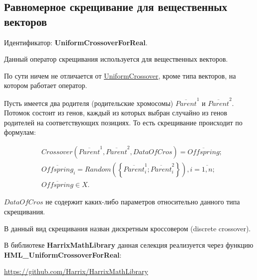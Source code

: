 \subsection{Равномерное скрещивание для вещественных векторов}\label{SetOfOperatorsAlgorithms:UniformCrossoverForReal}

Идентификатор: \textbf{UniformCrossoverForReal}.

Данный оператор скрещивания используется для вещественных векторов.

По сути ничем не отличается от \hyperref[SetOfOperatorsAlgorithms:UniformCrossover]{UniformCrossover}, кроме типа векторов, на котором работает оператор.

Пусть имеется два родителя (родительские хромосомы) $\overline{Parent}^1$ и $\overline{Parent}^2$. Потомок состоит из генов, каждый из которых выбран случайно из генов родителей на соответствующих позициях. То есть скрещивание происходит по формулам:

\begin{align}
\label{SetOfOperatorsAlgorithms:eq:UniformCrossoverForReal}
&Crossover \left( \overline{Parent}^1, \overline{Parent}^2, DataOfCros\right) = \overline{Offspring};\\
& \overline{Offspring}_i=Random\left( \left\lbrace \overline{Parent}^1_i;\overline{Parent}^2_i\right\rbrace \right), i=\overline{1,n} ;\nonumber\\
&\overline{Offspring}\in X.\nonumber
\end{align}

$ DataOfCros $ не содержит каких-либо параметров относительно данного типа скрещивания.

В \cite{web:basegroup.ru:real_coded_ga} данный вид скрещивания назван дискретным кроссовером (discrete crossover).

В библиотеке \textbf{HarrixMathLibrary} данная селекция реализуется через функцию \textbf{HML\_UniformCrossoverForReal}:

\href{https://github.com/Harrix/HarrixMathLibrary}{https://github.com/Harrix/HarrixMathLibrary}